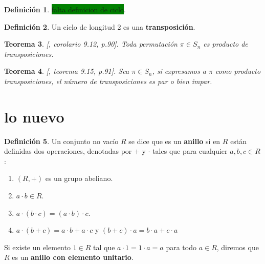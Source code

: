 \documentclass[12pt]{book}
\newtheorem{theorem}{Teorema}[section]
\theoremstyle{definition}
\newtheorem{definition}[theorem]{Definición}
\newcounter{in}
\newcounter{ini}
\begin{document}
\begin{definition}{{\setlength{\fboxsep}{0pt}\colorbox{green}{falta
        definicion de ciclo}}}.
  
\end{definition}

\begin{definition}
  Un ciclo de longitud 2 es una \textbf{transposición}.
\end{definition}

\begin{theorem}{[\cite{fraleigh}, corolario 9.12, p.90]}.
  Toda permutación $\pi\in S_{n}$ es producto de transposiciones.
\end{theorem}

\begin{theorem}{[\cite{fraleigh}, teorema 9.15, p.91]}.
  Sea $\pi\in S_{n}$, si expresamos a $\pi$ como producto
  transposiciones, el número de transposiciones es par o bien impar.
\end{theorem}

\section{lo nuevo}
\begin{definition}
  Un conjunto no vacío $R$ se dice que es un \textbf{anillo} si en $R$
  están definidas dos operaciones, denotadas por $+$ y $\cdot$ tales
  que para cualquier $a,b,c \in R$:
  \begin{enumerate}
  \item $(R,+)$ es un grupo abeliano.
  \item $a\cdot b\in R$.
  \item $a\cdot (b\cdot c)=(a\cdot b)\cdot c$.
  \item $a\cdot (b+c)=a\cdot b+a\cdot c$ y $(b+c)\cdot a=b\cdot a+c\cdot a$
  \end{enumerate}

  Si existe un elemento $1\in R$ tal que $a\cdot 1=1\cdot a=a$ para todo
  $a\in R$, diremos que $R$ es un \textbf{anillo con elemento unitario}.
\end{definition}
\end{document}
